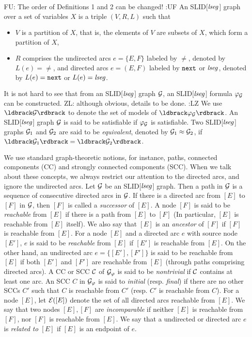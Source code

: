 \documentclass{llncs}
\newcommand{\zhilin}[1]{\color{red} {ZL: #1 :LZ} \color{black}}
\newcommand{\fu}[1]{\color{purple} {FU: #1 :UF} \color{black}}
\begin{document}
\begin{definition} \fu{The order of Definitions 1 and 2 can be changed!}
An SLID[$\mathit{lseg}$] graph over a set of variables $X$ is a triple $(V, R, L)$ such that
\begin{itemize}
\item $V$ is a partition of $X$, that is, the elements of $V$ are subsets of $X$, which form a partition of $X$,
%
\item $R$ comprises the undirected arcs $e=\{E, F\}$ labeled by $\neq$, denoted by $L(e)=\neq$, and directed arcs $e=(E,F)$ labeled by $\mathtt{next}$ or $\mathit{lseg}$, denoted by $L(e)=\mathtt{next}$ or $L(e)=\mathit{lseg}$.
%
\end{itemize}
\end{definition}
It is not hard to see that from an SLID[$\mathit{lseg}$] graph $\mathcal{G}$, an SLID[$\mathit{lseg}$] formula $\varphi_{\mathcal{G}}$ can be constructed.\zhilin{although obvious, details to be done.} We use $\ldbrack \Gg \rdbrack$ to denote the set of models of $\ldbrack \varphi_\Gg \rdbrack$. An SLID[$\mathit{lseg}$] graph $\mathcal{G}$ is said to be satisfiable if $\varphi_{\mathcal{G}}$ is satisfiable. Two SLID[$\mathit{lseg}$] graphs $\mathcal{G}_1$ and $\mathcal{G}_2$ are said to be \emph{equivalent}, denoted by $\mathcal{G}_1 \approx \mathcal{G}_2$, if $\ldbrack \Gg_1 \rdbrack = \ldbrack \Gg_2 \rdbrack$.



We use standard graph-theoretic notions, for instance, paths, connected components (CC) and strongly connected components (SCC).  When we talk about these concepts, we always restrict our attention to the directed arcs, and ignore the undirected arcs. Let $\mathcal{G}$ be an SLID[$\mathit{lseg}$] graph. Then a path in $\mathcal{G}$ is a sequence of consecutive directed arcs in $\mathcal{G}$. If there is a  directed arc from $[E]$ to $[F]$ in $\mathcal{G}$, then $[F]$ is called a \emph{successor} of $[E]$. A node $[F]$ is said to be \emph{reachable} from $[E]$ if there is a path from $[E]$ to $[F]$ (In particular, $[E]$ is reachable from $[E]$ itself). We also say that $[E]$ is an \emph{ancestor} of $[F]$ if $[F]$ is reachable from $[E]$. For a node $[E]$ and a directed arc $e$ with source node $[E']$, $e$ is said to be \emph{reachable} from $[E]$ if $[E']$ is reachable from $[E]$.  On the other hand, an undirected arc $e=\{[E'],[F']\}$ is said to be reachable from $[E]$ if both $[E']$ and $[F']$ are reachable from $[E]$ (through paths comprising directed arcs). A CC or SCC $\mathcal{C}$ of $\mathcal{G}_\varphi$ is said to be \emph{nontrivial} if $\mathcal{C}$ contains at least one arc. An SCC $C$ in $\mathcal{G}_\varphi$ is said to \emph{initial} (resp. \emph{final}) if there are no other SCCs $C'$ such that $C$ is reachable from $C'$ (resp. $C'$ is reachable from $C$).
For a node $[E]$, let $\mathcal{E}([E])$ denote the set of all directed arcs reachable from $[E]$. We say that two nodes $[E],[F]$ are \emph{incomparable} if neither $[E]$ is reachable from $[F]$, nor $[F]$ is reachable from $[E]$. We say that a undirected or directed arc $e$ is \emph{related to} $[E]$ if $[E]$ is an endpoint of $e$.
\end{document}
